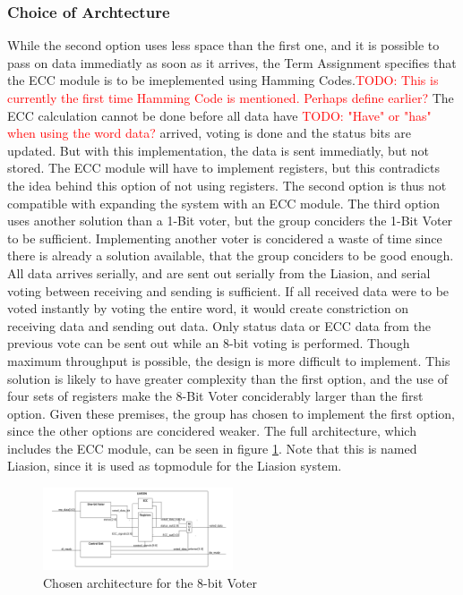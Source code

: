 \documentclass[a4paper]{IEEEtran}
\newcommand\TODO[1]{\textcolor{red}{TODO:#1}}
\newcommand\todo[1]{\TODO{#1}}
\begin{document}
\subsubsection{Choice of Archtecture}
While the second option uses less space than the first one, and it is possible to pass on data immediatly as soon as it arrives, the Term Assignment specifies that the ECC module is to be imeplemented using Hamming Codes.\todo{ This is currently the first time Hamming Code is mentioned. Perhaps define earlier?} 
The ECC calculation cannot be done before all data have \todo{ "Have" or "has" when using the word data?} arrived, voting is done and the status bits are updated.
But with this implementation, the data is sent immediatly, but not stored.
The ECC module will have to implement registers, but this contradicts the idea behind this option of not using registers.
The second option is thus not compatible with expanding the system with an ECC module.
\break
The third option uses another solution than a 1-Bit voter, but the group conciders the 1-Bit Voter to be sufficient.
Implementing another voter is concidered a waste of time since there is already a solution available, that the group conciders to be good enough.
All data arrives serially, and are sent out serially from the Liasion, and serial voting between receiving and sending is sufficient.
If all received data were to be voted instantly by voting the entire word, it would create constriction on receiving data and sending out data.
Only status data or ECC data from the previous vote can be sent out while an 8-bit voting is performed.
Though maximum throughput is possible, the design is more difficult to implement.
This solution is likely to have greater complexity than the first option, and the use of four sets of registers make the 8-Bit Voter conciderably larger than the first option.
Given these premises, the group has chosen to implement the first option, since the other options are concidered weaker.
The full architecture, which includes the ECC module, can be seen in figure \ref{fig:ArchitectureFinal}. Note that this is named Liasion, since it is used as topmodule for the Liasion system.

\begin{figure}[h!]
    \centering
    \includegraphics[width=0.5\textwidth]{Figures/Solution/ArchitectureFinal}
    \caption{Chosen architecture for the 8-bit Voter}
    \label{fig:ArchitectureFinal}
\end{figure}
\end{document}
